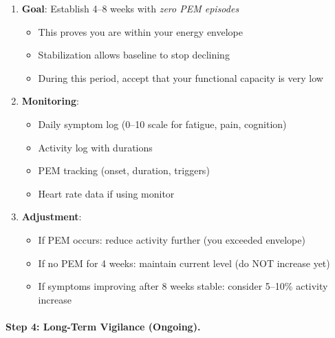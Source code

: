 \begin{enumerate}
    \item \textbf{Goal}: Establish 4--8 weeks with \emph{zero PEM episodes}
    \begin{itemize}
        \item This proves you are within your energy envelope
        \item Stabilization allows baseline to stop declining
        \item During this period, accept that your functional capacity is very low
    \end{itemize}

    \item \textbf{Monitoring}:
    \begin{itemize}
        \item Daily symptom log (0--10 scale for fatigue, pain, cognition)
        \item Activity log with durations
        \item PEM tracking (onset, duration, triggers)
        \item Heart rate data if using monitor
    \end{itemize}

    \item \textbf{Adjustment}:
    \begin{itemize}
        \item If PEM occurs: reduce activity further (you exceeded envelope)
        \item If no PEM for 4 weeks: maintain current level (do NOT increase yet)
        \item If symptoms improving after 8 weeks stable: consider 5--10\% activity increase
    \end{itemize}
\end{enumerate}

\paragraph{Step 4: Long-Term Vigilance (Ongoing).}

